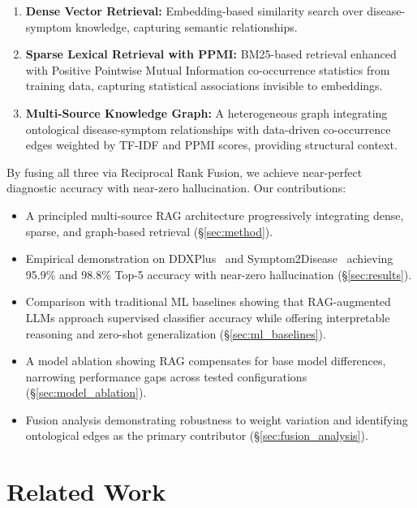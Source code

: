 \documentclass[runningheads]{llncs}
\begin{document}
\begin{enumerate}
    \item \textbf{Dense Vector Retrieval:} Embedding-based similarity search over disease-symptom knowledge, capturing semantic relationships.
    \item \textbf{Sparse Lexical Retrieval with PPMI:} BM25-based retrieval enhanced with Positive Pointwise Mutual Information co-occurrence statistics from training data, capturing statistical associations invisible to embeddings.
    \item \textbf{Multi-Source Knowledge Graph:} A heterogeneous graph integrating ontological disease-symptom relationships with data-driven co-occurrence edges weighted by TF-IDF and PPMI scores, providing structural context.
\end{enumerate}

By fusing all three via Reciprocal Rank Fusion, we achieve near-perfect diagnostic accuracy with near-zero hallucination. Our contributions:
\begin{itemize}
    \item A principled multi-source RAG architecture progressively integrating dense, sparse, and graph-based retrieval (\S\ref{sec:method}).
    \item Empirical demonstration on DDXPlus~\cite{fansi2022ddxplus} and Symptom2Disease~\cite{gretelai_s2d} achieving 95.9\% and 98.8\% Top-5 accuracy with near-zero hallucination (\S\ref{sec:results}).
    \item Comparison with traditional ML baselines showing that RAG-augmented LLMs approach supervised classifier accuracy while offering interpretable reasoning and zero-shot generalization (\S\ref{sec:ml_baselines}).
    \item A model ablation showing RAG compensates for base model differences, narrowing performance gaps across tested configurations (\S\ref{sec:model_ablation}).
    \item Fusion analysis demonstrating robustness to weight variation and identifying ontological edges as the primary contributor (\S\ref{sec:fusion_analysis}).
\end{itemize}

\section{Related Work}
\label{sec:related}
\end{document}
